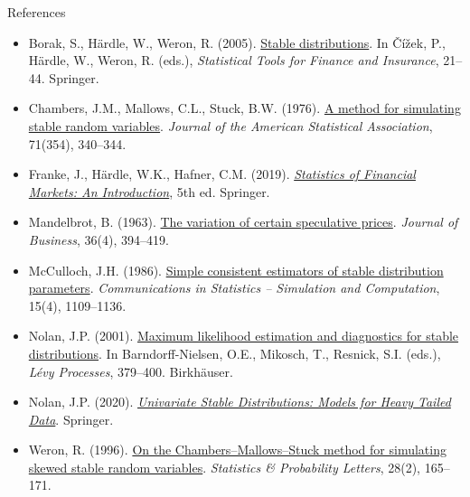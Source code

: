 \begin{frame}{References}
\itemsize{\tiny}
\begin{itemize}
    \item Borak, S., Härdle, W., Weron, R. (2005). \href{https://doi.org/10.1007/3-540-27395-6_1}{Stable distributions}. In Čížek, P., Härdle, W., Weron, R. (eds.), \textit{Statistical Tools for Finance and Insurance}, 21--44. Springer.
    \item Chambers, J.M., Mallows, C.L., Stuck, B.W. (1976). \href{https://doi.org/10.1080/01621459.1976.10480344}{A method for simulating stable random variables}. \textit{Journal of the American Statistical Association}, 71(354), 340--344.
    \item Franke, J., Härdle, W.K., Hafner, C.M. (2019). \href{https://doi.org/10.1007/978-3-030-13751-9}{\textit{Statistics of Financial Markets: An Introduction}}, 5th ed. Springer.
    \item Mandelbrot, B. (1963). \href{https://doi.org/10.1086/294632}{The variation of certain speculative prices}. \textit{Journal of Business}, 36(4), 394--419.
    \item McCulloch, J.H. (1986). \href{https://doi.org/10.1080/03610918608812563}{Simple consistent estimators of stable distribution parameters}. \textit{Communications in Statistics -- Simulation and Computation}, 15(4), 1109--1136.
    \item Nolan, J.P. (2001). \href{https://doi.org/10.1007/978-1-4612-0197-7_17}{Maximum likelihood estimation and diagnostics for stable distributions}. In Barndorff-Nielsen, O.E., Mikosch, T., Resnick, S.I. (eds.), \textit{Lévy Processes}, 379--400. Birkhäuser.
    \item Nolan, J.P. (2020). \href{https://doi.org/10.1007/978-3-030-52915-4}{\textit{Univariate Stable Distributions: Models for Heavy Tailed Data}}. Springer.
    \item Weron, R. (1996). \href{https://doi.org/10.1016/0167-7152(95)00113-1}{On the Chambers--Mallows--Stuck method for simulating skewed stable random variables}. \textit{Statistics \& Probability Letters}, 28(2), 165--171.
\end{itemize}
\end{frame}


